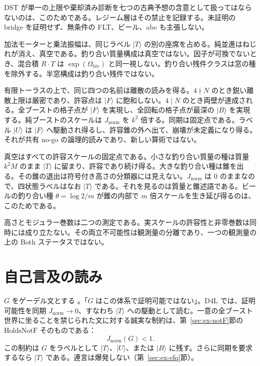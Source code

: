 \documentclass[a4paper]{article}
\theoremstyle{definition}
\newcommand{\Jnorm}{J_{\mathrm{norm}}}
\begin{document}
DST が単一の上限や棄却済み診断を七つの古典予想の含意として扱ってはならないのは、このためである。レジーム層はその禁止を記録する。未証明の bridge を証明せず、無条件の FLT、ビール、abc も主張しない。

加法モーターと乗法振幅は、同じラベル \(\lvert T\rangle\) の別の座席を占める。純並進はねじれが消え、真空である。釣り合い質量構成は真空ではない。因子が可換でないとき、混合積 \(R\cdot T\) は \(\exp(\Omega_{\mathrm{biv}})\) と同一視しない。釣り合い残件クラスは窓の種を除外する。半窓構成は釣り合い残件ではない。

有限トーラスの上で、同じ四つの名前は離散の読みを得る。\(4\nmid N\) のとき鋭い離散上限は厳密であり、許容点は \(\lvert F\rangle\) に飽和しない。\(4\mid N\) のとき両壁が達成される。全ブーストの格子点が \(\lvert F\rangle\) を実現し、全回転の格子点が最深の \(\lvert B\rangle\) を実現する。純ブーストのスケールは \(\Jnorm\) を \(k^2\) 倍する。同期は固定点である。ラベル \(\lvert U\rangle\) は \(\lvert F\rangle\) へ駆動され得るし、許容錐の外へ出て、崩壊が未定義になり得る。それが共有 no-go の論理的読みであり、新しい算術ではない。

真空はすべての許容スケールの固定点である。小さな釣り合い質量の種は質量 \(k^2 M\) のまま \(\lvert T\rangle\) に留まり、許容であり続け得る。大きな釣り合い種は錐を出る。その錐の退出は符号付き高さの分類器には見えない。\(\Jnorm\) は \(0\) のままなので、四状態ラベルはなお \(\lvert T\rangle\) である。それを見るのは質量と錐述語である。ビールの釣り合い種 \(\theta=\log 2/m\) が錐の内部で \(m\) 倍スケールを生き延び得るのは、このためである。

高さとモジュラー巻数は二つの測定である。実スケールの許容性と非零巻数は同時には成り立たない。その両立不可能性は観測量の分離であり、一つの観測量の上の Both ステータスではない。

\section{自己言及の読み}
\label{sec:godel}

\(G\) をゲーデル文とする \cite{Godel1931}。「\(G\) はこの体系で証明可能ではない」。D4L では、証明可能性を同期 \(\Jnorm\to 0\)、すなわち \(\lvert T\rangle\) への駆動として読む。一意の全ブースト世界に坐ることを禁じられた文に対する誠実な制約は、第~\ref{sec:ex-notF}節の \(\mathrm{HoldsNotF}\) そのものである：
\[
\Jnorm(G)<1.
\]
この制約は \(G\) をラベルとして \(\lvert T\rangle\)、\(\lvert U\rangle\)、または \(\lvert B\rangle\) に残す。さらに同期を要求するなら \(\lvert T\rangle\) である。連言は爆発しない（第~\ref{sec:ex-efq}節）。
\end{document}
